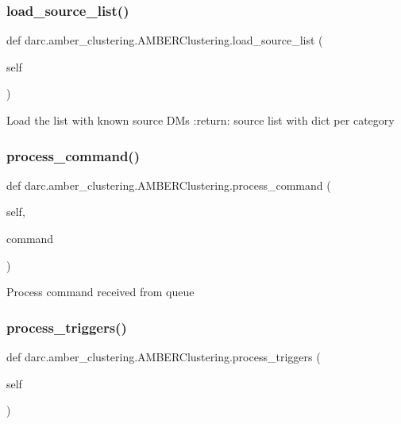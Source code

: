 \subsubsection{\texorpdfstring{load\_source\_list()}{load\_source\_list()}}
{\footnotesize\ttfamily def darc.\+amber\+\_\+clustering.\+A\+M\+B\+E\+R\+Clustering.\+load\+\_\+source\+\_\+list (\begin{DoxyParamCaption}\item[{}]{self }\end{DoxyParamCaption})}

\begin{DoxyVerb}Load the list with known source DMs
:return: source list with dict per category
\end{DoxyVerb}
 \mbox{\label{classdarc_1_1amber__clustering_1_1_a_m_b_e_r_clustering_a4aeb420b469d629e6f3f1acb21192467}} 
\subsubsection{\texorpdfstring{process\_command()}{process\_command()}}
{\footnotesize\ttfamily def darc.\+amber\+\_\+clustering.\+A\+M\+B\+E\+R\+Clustering.\+process\+\_\+command (\begin{DoxyParamCaption}\item[{}]{self,  }\item[{}]{command }\end{DoxyParamCaption})}

\begin{DoxyVerb}Process command received from queue
\end{DoxyVerb}
 \mbox{\label{classdarc_1_1amber__clustering_1_1_a_m_b_e_r_clustering_a6a4989b747b2c81786fdfc86964d162e}} 
\subsubsection{\texorpdfstring{process\_triggers()}{process\_triggers()}}
{\footnotesize\ttfamily def darc.\+amber\+\_\+clustering.\+A\+M\+B\+E\+R\+Clustering.\+process\+\_\+triggers (\begin{DoxyParamCaption}\item[{}]{self }\end{DoxyParamCaption})}

